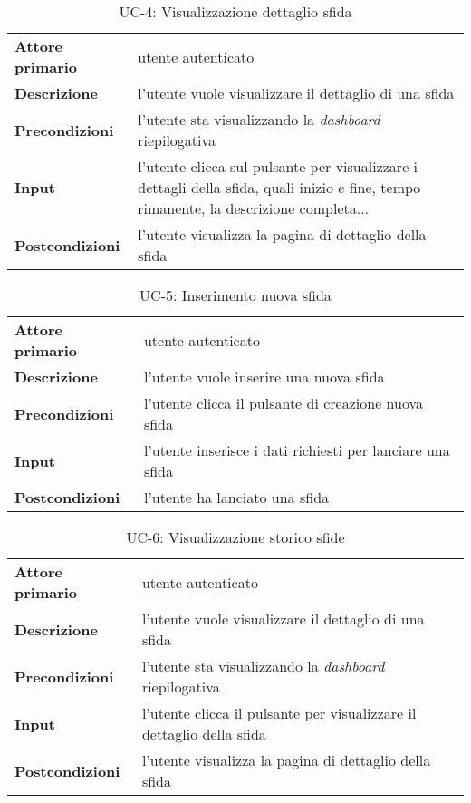 \begin{table}[H]
    \centering
    \begin{tabular}{|p{3cm}p{11.15cm}|}
        \hline
        \textbf{Attore primario} & utente autenticato \\
        \textbf{Descrizione} & l’utente vuole visualizzare il dettaglio di una sfida \\
        \textbf{Precondizioni} & l’utente sta visualizzando la \textit{dashboard} riepilogativa \\
        \textbf{Input} & l’utente clicca sul pulsante per visualizzare i dettagli della sfida, quali inizio e fine, tempo rimanente, la descrizione completa... \\
        \textbf{Postcondizioni} & l’utente visualizza la pagina di dettaglio della sfida \\\hline
    \end{tabular}
    \caption{UC-4: Visualizzazione dettaglio sfida}
\end{table}
\begin{table}[H]
    \centering
    \begin{tabular}{|p{3cm}p{11.15cm}|}
        \hline
        \textbf{Attore primario} & utente autenticato \\
        \textbf{Descrizione} & l’utente vuole inserire una nuova sfida \\
        \textbf{Precondizioni} & l’utente clicca il pulsante di creazione nuova sfida \\
        \textbf{Input} & l’utente inserisce i dati richiesti per lanciare una sfida \\
        \textbf{Postcondizioni} & l’utente ha lanciato una sfida \\\hline
    \end{tabular}
    \caption{UC-5: Inserimento nuova sfida}
\end{table}
\begin{table}[H]
    \centering
    \begin{tabular}{|p{3cm}p{11.15cm}|}
        \hline
        \textbf{Attore primario} & utente autenticato \\
        \textbf{Descrizione} & l’utente vuole visualizzare il dettaglio di una sfida \\
        \textbf{Precondizioni} & l’utente sta visualizzando la \textit{dashboard} riepilogativa \\
        \textbf{Input} & l’utente clicca il pulsante per visualizzare il dettaglio della sfida \\
        \textbf{Postcondizioni} & l’utente visualizza la pagina di dettaglio della sfida \\\hline
    \end{tabular}
    \caption{UC-6: Visualizzazione storico sfide}
\end{table}
